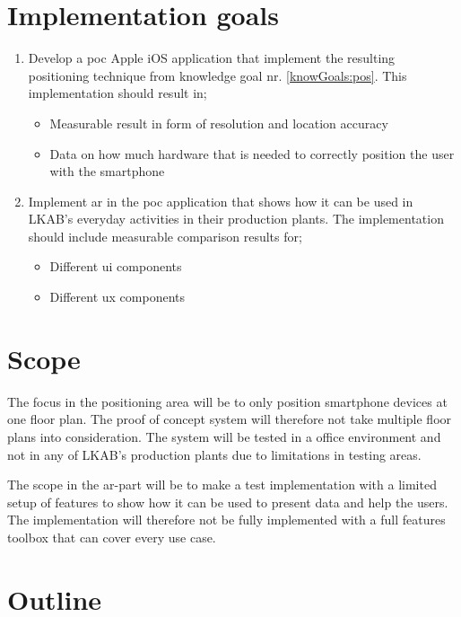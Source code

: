 \section{Implementation goals} \begin{enumerate} \item \label{implGoals:posPoc}
  Develop a \acrfull{poc} Apple iOS application that implement the resulting
  positioning technique from knowledge goal nr. \ref{knowGoals:pos}. This
  implementation should result in; \begin{itemize} \item Measurable result in
  form of resolution and location accuracy \item Data on how much hardware that
  is needed to correctly position the user with the smartphone \end{itemize}
\item Implement \acrshort{ar} in the \acrshort{poc} application that shows how
  it can be used in LKAB's everyday activities in their production plants.  The
implementation should include measurable comparison results for; \begin{itemize}
\item Different \acrfull{ui} components \item Different \acrfull{ux} components
\end{itemize} \end{enumerate}

\section{Scope} The focus in the positioning area will be to only position
smartphone devices at one floor plan.  The proof of concept system will
therefore not take multiple floor plans into consideration.  The system will be
tested in a office environment and not in any of LKAB's production plants due to
limitations in testing areas.

\bigskip

The scope in the \acrshort{ar}-part will be to make a test implementation with a
limited setup of features to show how it can be used to present data and help
the users.  The implementation will therefore not be fully implemented with a
full features toolbox that can cover every use case.


\section{Outline}
